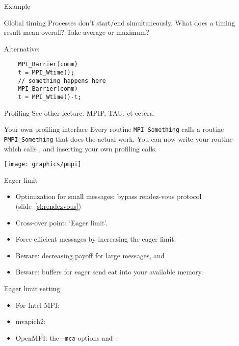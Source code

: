 \begin{numberedframe}{Example}
\end{numberedframe}

\begin{numberedframe}{Global timing}
  Processes don't start/end simultaneously. What does a timing result
  mean overall? Take average or maximum?

  Alternative:
  \begin{lstlisting}
    MPI_Barrier(comm)
    t = MPI_Wtime();
    // something happens here
    MPI_Barrier(comm)
    t = MPI_Wtime()-t;
  \end{lstlisting}
\end{numberedframe}

\begin{numberedframe}{Profiling}
  See other lecture: 
  MPIP, TAU, et cetera.
\end{numberedframe}

\begin{numberedframe}{Your own profiling interface}
  Every routine \lstinline{MPI_Something} calls a routine \lstinline{PMPI_Something} that 
  does the actual work. You can now write your  routine
  which calls , and inserting your own profiling calls.

  \texttt{[image: graphics/pmpi]}
\end{numberedframe}


\begin{numberedframe}{Eager limit}
  \begin{itemize}
  \item Optimization for small messages: bypass rendez-vous protocol
    (slide~\ref{sl:rendezvous})
  \item Cross-over point: `Eager limit'.
  \item Force efficient messages by increasing the eager limit.
  \item Beware: decreasing payoff for large messages, and
  \item Beware: buffers for eager send eat into your available memory.
  \end{itemize}
\end{numberedframe}

\begin{numberedframe}{Eager limit setting}
    \begin{itemize}
    \item For Intel MPI: 
    \item mvapich2: 
    \item OpenMPI:  the
      \texttt{--mca} options  and
      .
    \end{itemize}
\end{numberedframe}

